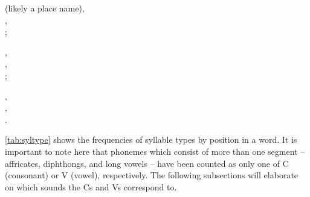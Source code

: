 	\a {} (likely a place name),\\
		,\\
		;
		
	\a {},\\
		,\\
		;
		
	\a {},\\
		,\\
		.
\xe

\autoref{tab:syltype} shows the frequencies of syllable types by position in a 
word. It is important to note here that phonemes which consist of more than one 
segment -- affricates, diphthongs, and long vowels -- have been counted as only 
one of C (consonant) or V (vowel), respectively. The following subsections will 
elaborate on which sounds the Cs and Vs correspond to.

